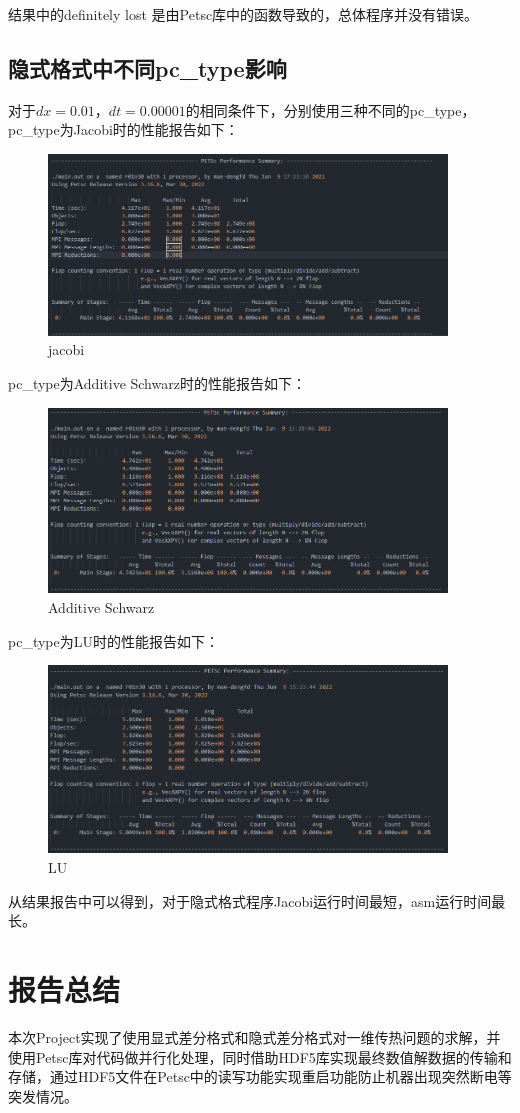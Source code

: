 \documentclass[
	20pt%
]{SUSTechHomework}
\begin{document}
\qquad 结果中的definitely lost 是由Petsc库中的函数导致的，总体程序并没有错误。
\subsection{隐式格式中不同pc\_type影响}
\qquad 对于$dx=0.01$，$dt=0.00001$的相同条件下，分别使用三种不同的pc\_type，pc\_type为Jacobi时的性能报告如下：
\begin{figure}[h]
    \centering
    \includegraphics[width=300pt]{img/jacobi.jpg}
    \caption{jacobi}
    \label{fig:my_label}
\end{figure}

\qquad pc\_type为Additive Schwarz时的性能报告如下：
\begin{figure}[h]
    \centering
    \includegraphics[width=300pt]{img/asm.jpg}
    \caption{Additive Schwarz}
    \label{fig:my_label}
\end{figure}
\clearpage
\qquad pc\_type为LU时的性能报告如下：
\begin{figure}[h]
    \centering
    \includegraphics[width=300pt]{img/lu.jpg}
    \caption{LU}
    \label{fig:my_label}
\end{figure}

\qquad 从结果报告中可以得到，对于隐式格式程序Jacobi运行时间最短，asm运行时间最长。

\section{报告总结}
\qquad 本次Project实现了使用显式差分格式和隐式差分格式对一维传热问题的求解，并使用Petsc库对代码做并行化处理，同时借助HDF5库实现最终数值解数据的传输和存储，通过HDF5文件在Petsc中的读写功能实现重启功能防止机器出现突然断电等突发情况。
\end{document}
